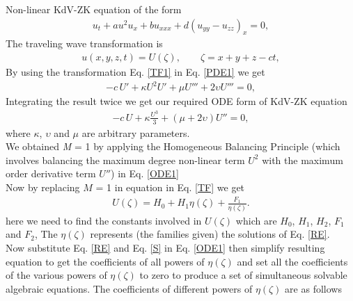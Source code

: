 \documentclass[10pt]{NSP1}
\numberwithin{equation}{section}
\begin{document}
Non-linear KdV-ZK equation of the form
\begin{eqnarray}\label{PDE1}
u_{t}+a u^2 u_{x}+b u_{xxx}+d(u_{yy}-u_{zz})_{x}=0,
\end{eqnarray}
The traveling wave transformation is
\begin{eqnarray}\label{TF1}
u(x,y,z,t)=U(\zeta), \qquad \zeta=x+y+z-ct,
\end{eqnarray}
By using the transformation Eq. \ref{TF1} in  Eq. \ref{PDE1} we get
\begin{eqnarray}
    -c\,U'+\kappa U^2 U'+ \mu U'''+2\upsilon U'''=0,
\end{eqnarray}
Integrating the result twice we get our required ODE form of KdV-ZK equation
\begin{eqnarray}\label{ODE1}
    -c\,U+\kappa \frac{U^3}{3}+ (\mu+2\upsilon)U''=0,
\end{eqnarray}
where $\kappa$, $\upsilon$ and $\mu$ are arbitrary parameters.\\
We obtained \emph{M} = 1 by applying the Homogeneous Balancing Principle (which involves balancing the maximum degree non-linear term $U^{2}$ with the maximum order derivative term $U''$) in Eq. \ref{ODE1} \\
Now by replacing $M$ = 1 in equation in Eq. \ref{TF} we get
\begin{eqnarray}\label{S}
U  \left(\zeta \right) =H_{0}+H_{1} \eta \left(\zeta \right)+\frac{F_{1}}{\eta \left(\zeta \right)}.
\end{eqnarray}
here we need to find the constants involved in $U{(\zeta)}$ which are $H_{0}$, $H_{1}$, $H_{2}$, $F_{1}$ and $F_{2}$,
The $\eta{(\zeta)}$ represents (the families given) the solutions of Eq. \ref{RE}.\\
Now substitute Eq. \ref{RE} and Eq. \ref{S} in Eq. \ref{ODE1} then simplify resulting equation to get the coefficients of all powers of ${\eta(\zeta)}$ and set all the coefficients of the various powers of $\eta{(\zeta)}$ to zero to produce a set of simultaneous solvable algebraic equations.
The coefficients of different powers of $\eta{(\zeta)}$ are as follows\\
\end{document}

